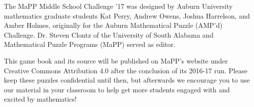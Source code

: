 
The MaPP Middle School Challenge '17
was designed by Auburn University mathematics graduate students
Kat Perry, Andrew Owens, Joshua Harrelson, and
Amber Holmes, originally
for the Auburn Mathematical Puzzle (AMP'd) Challenge. Dr. Steven Clontz
of the University of South Alabama and Mathematical Puzzle Programs (MaPP)
served as editor.

This game book and its source will be published on MaPP's website
 under Creative Commons Attribution 4.0 after
the conclusion of its 2016-17 run. Please keep these puzzles
confidential until then, but afterwards we
encourage you to use our material in your classroom to help get more
students engaged with and excited by mathematics!
